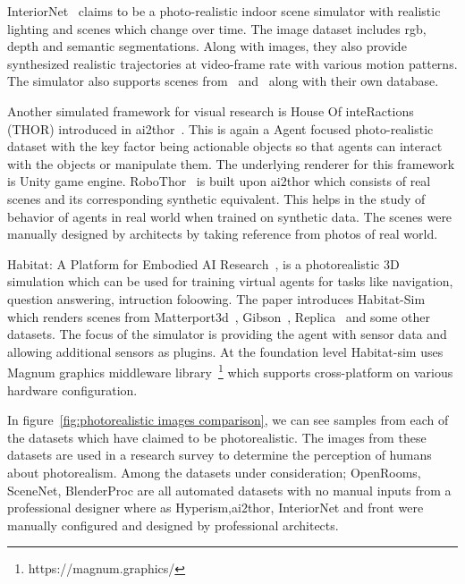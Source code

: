 InteriorNet~\cite{InteriorNet18} claims to be a photo-realistic indoor scene simulator with realistic lighting and scenes which change over time.
The image dataset includes rgb, depth and semantic segmentations.
Along with images, they also provide synthesized realistic trajectories at video-frame rate with various motion patterns.
The simulator also supports scenes from~\cite{McCormac:etal:ICCV2017} and~\cite{Song2017SemanticSC} along with their own database.

Another simulated framework for visual research is House Of inteRactions (THOR) introduced in \gls{ai2thor}~\cite{kolve2019ai2thor}.
This is again a Agent focused photo-realistic dataset with the key factor being actionable objects so that agents can interact with the objects or manipulate them.
The underlying renderer for this framework is Unity game engine.
RoboThor~\cite{Deitke2020RoboTHORAO} is built upon \gls{ai2thor} which consists of real scenes and its corresponding synthetic equivalent.
This helps in the study of behavior of agents in real world when trained on synthetic data.
The scenes were manually designed by architects by taking reference from photos of real world.

Habitat: A Platform for Embodied AI Research~\cite{savva2019habitat}, is a photorealistic 3D simulation which can be used for training virtual agents for tasks like navigation, question answering, intruction foloowing.
The paper introduces Habitat-Sim which renders scenes from Matterport3d~\cite{chang2017matterport3d}, Gibson~\cite{xia2018gibson}, Replica~\cite{Straub2019TheRD} and some other datasets.
The focus of the simulator is providing the agent with sensor data and allowing additional sensors as plugins.
At the foundation level Habitat-sim uses Magnum graphics
middleware library~\footnote{https://magnum.graphics/} which supports cross-platform on various hardware configuration.

In figure~\ref{fig:photorealistic images comparison}, we can see samples from each of the datasets which have claimed to be photorealistic.
The images from these datasets are used in a research survey to determine the perception of humans about photorealism.
Among the datasets under consideration;
OpenRooms, SceneNet, BlenderProc are all automated datasets with no manual inputs from a professional designer where as
Hyperism,\gls{ai2thor}, InteriorNet and \gls{front} were manually configured and designed by professional architects.


